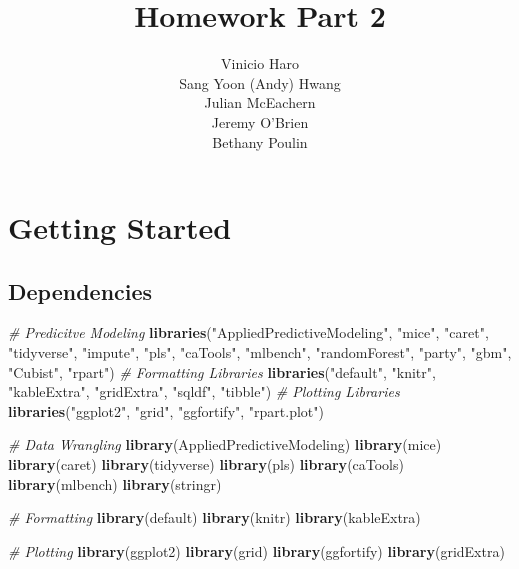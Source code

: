\documentclass[]{report}
\title{Homework Part 2}
\author{Vinicio Haro \\ Sang Yoon (Andy) Hwang \\ Julian McEachern \\ Jeremy O'Brien \\ Bethany Poulin}
\date{}
\newenvironment{Shaded}{\begin{snugshade}}{\end{snugshade}}
\newcommand{\KeywordTok}[1]{\textcolor[rgb]{0.13,0.29,0.53}{\textbf{#1}}}
\newcommand{\StringTok}[1]{\textcolor[rgb]{0.31,0.60,0.02}{#1}}
\newcommand{\CommentTok}[1]{\textcolor[rgb]{0.56,0.35,0.01}{\textit{#1}}}
\newcommand{\NormalTok}[1]{#1}
\begin{document}
\maketitle

{
\setcounter{tocdepth}{2}
\tableofcontents
}
\chapter*{Getting Started}\label{Overview}

\section{Dependencies}\label{dependencies}

\begin{Shaded}
\begin{Highlighting}[]
\CommentTok{# Predicitve Modeling}
\KeywordTok{libraries}\NormalTok{(}\StringTok{"AppliedPredictiveModeling"}\NormalTok{, }\StringTok{"mice"}\NormalTok{, }\StringTok{"caret"}\NormalTok{, }\StringTok{"tidyverse"}\NormalTok{, }
    \StringTok{"impute"}\NormalTok{, }\StringTok{"pls"}\NormalTok{, }\StringTok{"caTools"}\NormalTok{, }\StringTok{"mlbench"}\NormalTok{, }\StringTok{"randomForest"}\NormalTok{, }\StringTok{"party"}\NormalTok{, }
    \StringTok{"gbm"}\NormalTok{, }\StringTok{"Cubist"}\NormalTok{, }\StringTok{"rpart"}\NormalTok{)}
\CommentTok{# Formatting Libraries}
\KeywordTok{libraries}\NormalTok{(}\StringTok{"default"}\NormalTok{, }\StringTok{"knitr"}\NormalTok{, }\StringTok{"kableExtra"}\NormalTok{, }\StringTok{"gridExtra"}\NormalTok{, }\StringTok{"sqldf"}\NormalTok{, }
    \StringTok{"tibble"}\NormalTok{)}
\CommentTok{# Plotting Libraries}
\KeywordTok{libraries}\NormalTok{(}\StringTok{"ggplot2"}\NormalTok{, }\StringTok{"grid"}\NormalTok{, }\StringTok{"ggfortify"}\NormalTok{, }\StringTok{"rpart.plot"}\NormalTok{)}

\CommentTok{# Data Wrangling}
\KeywordTok{library}\NormalTok{(AppliedPredictiveModeling)}
\KeywordTok{library}\NormalTok{(mice)}
\KeywordTok{library}\NormalTok{(caret)}
\KeywordTok{library}\NormalTok{(tidyverse)}
\KeywordTok{library}\NormalTok{(pls)}
\KeywordTok{library}\NormalTok{(caTools)}
\KeywordTok{library}\NormalTok{(mlbench)}
\KeywordTok{library}\NormalTok{(stringr)}

\CommentTok{# Formatting}
\KeywordTok{library}\NormalTok{(default)}
\KeywordTok{library}\NormalTok{(knitr)}
\KeywordTok{library}\NormalTok{(kableExtra)}

\CommentTok{# Plotting}
\KeywordTok{library}\NormalTok{(ggplot2)}
\KeywordTok{library}\NormalTok{(grid)}
\KeywordTok{library}\NormalTok{(ggfortify)}
\KeywordTok{library}\NormalTok{(gridExtra)}
\end{Highlighting}
\end{Shaded}
\end{document}
